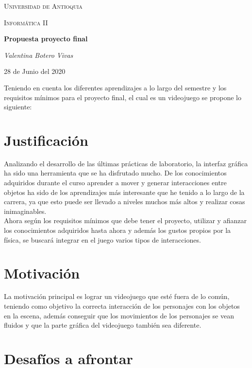 \documentclass{report}   %
\begin{document}
\begin{titlepage}    %
	\centering
	{\scshape\LARGE Universidad de Antioquia \par}
	\vspace{4cm}
	{\scshape\Large Informática II  \par}
	\vspace{4cm}
	{\huge\bfseries Propuesta proyecto final\par}
	\vspace{2cm}
	{\Large\itshape Valentina Botero Vivas \par}
    \vspace{4cm}
	{\large 28 de Junio del 2020 \par}
		
\end{titlepage}

Teniendo en cuenta los diferentes aprendizajes a lo largo del semestre y los requisitos mínimos para el proyecto final, el cual es un videojuego se propone lo siguiente: 

\section{Justificación}

Analizando el desarrollo de las últimas prácticas de laboratorio, la interfaz gráfica ha sido una herramienta que se ha disfrutado mucho. De los conocimientos adquiridos durante el curso aprender a mover y generar interacciones entre objetos ha sido de los aprendizajes más interesante que he tenido a lo largo de la carrera, ya que esto puede ser llevado a niveles muchos más altos y realizar cosas inimaginables.\\
Ahora según los requisitos mínimos que debe tener el proyecto, utilizar y afianzar los conocimientos adquiridos hasta ahora y además los gustos propios por la física, se buscará integrar en el juego varios tipos de interacciones.  
 

\section{Motivación}

La motivación principal es lograr un videojuego que esté fuera de lo común, teniendo como objetivo la correcta interacción de los personajes con los objetos en la escena, además conseguir que los movimientos de los personajes se vean fluidos y que la parte gráfica del videojuego también sea diferente.

\section{Desafíos a afrontar}
\end{document}
